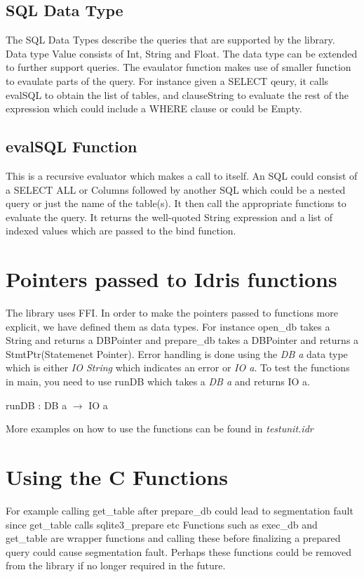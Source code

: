 \documentclass[11pt]{article}
\begin{document}
\subsection{SQL Data Type}
\label{SQL Data Type}
The SQL Data Types describe the queries that are supported by the library.
Data type Value consists of Int, String and Float.
The data type can be extended to further support queries.
The evaulator function makes use of smaller function to evaulate parts of the query.
For instance given a SELECT qeury, it calls evalSQL to obtain the list of tables,
and clauseString to evaluate the rest of the expression which could include a WHERE clause or could be Empty.
\subsection{evalSQL Function}
\label{evalSQL Function}
This is a recursive evaluator which makes a call to itself.
An SQL could consist of a SELECT ALL or Columns followed by another SQL
which could be a nested query or just the name of the table(s).
It then call the appropriate functions to evaluate the query.
It returns the well-quoted String expression and a list of indexed values which are passed to the bind function.
\section{Pointers passed to Idris functions}
\label{Pointers passed to Idris functions}

The library uses FFI. In order to make the pointers passed to functions more explicit,
we have defined them as data types. For instance open\_db takes a String and returns a DBPointer and prepare\_db
takes a DBPointer and returns a StmtPtr(Statemenet Pointer).
Error handling is done using the \emph {DB a} data type which
is either \emph {IO String} which indicates an error or \emph{ IO a}.
To test the functions in main, you need to use runDB which takes a \emph{ DB a} and returns IO a.
\begin{center}
\centering                                           runDB : DB a $\rightarrow$ IO a
\end{center}
More examples on how to use the functions can be found in \emph{testunit.idr}

\section{Using the C Functions}
\label{Using the C Functions}

For example calling get\_table after prepare\_db could lead to 
segmentation fault since get\_table calls sqlite3\_prepare etc
Functions such as exec\_db and get\_table are wrapper functions
and calling these before finalizing a prepared query could cause segmentation fault.
Perhaps these functions could be removed from the library if no longer required in the future.
\end{document}
